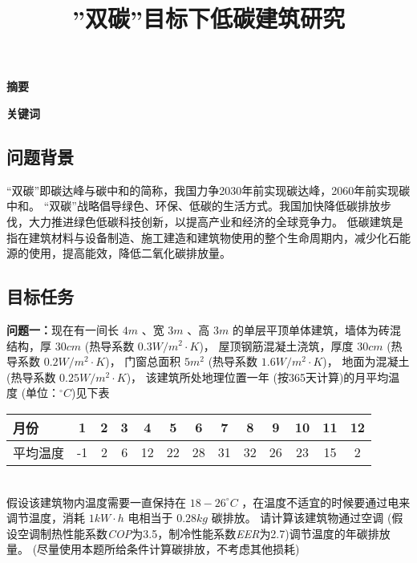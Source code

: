 \documentclass[a4paper, 12pt]{article}
\numberwithin{equation}{section}
\begin{document}
    \title{''双碳''目标下低碳建筑研究}
    \author{}
    \date{}
    \maketitle

    \centerline{\textbf{\LARGE{摘要}}}

    \textbf{\large{关键词}}

    {}
        \subsection{问题背景}
        “双碳”即碳达峰与碳中和的简称，我国力争2030年前实现碳达峰，2060年前实现碳中和。
        “双碳”战略倡导绿色、环保、低碳的生活方式。我国加快降低碳排放步伐，大力推进绿色低碳科技创新，以提高产业和经济的全球竞争力。
        低碳建筑是指在建筑材料与设备制造、施工建造和建筑物使用的整个生命周期内，减少化石能源的使用，提高能效，降低二氧化碳排放量。

        \subsection{目标任务}
            \textbf{问题一：}现在有一间长 $ 4 m $ 、宽 $ 3 m $ 、高 $ 3 m $ 的单层平顶单体建筑，墙体为砖混结构，厚 $ 30 cm $ (热导系数 $ 0.3 W / m^{2} \cdot K $)，
            屋顶钢筋混凝土浇筑，厚度 $ 30 cm $ (热导系数 $ 0.2 W / m^{2} \cdot K $)，
            门窗总面积 $ 5 m^{2} $ (热导系数 $ 1.6 W / m^{2} \cdot K $)，
            地面为混凝土 (热导系数 $ 0.25 W / m^{2} \cdot K $)，
            该建筑所处地理位置一年 (按365天计算)的月平均温度 (单位：$ ^{\circ} C $)见下表 \\
            \begin{table}
                \centering
                \begin{tabular}{|l|c|c|c|c|c|c|c|c|c|c|c|c|}
                    \hline
                    月份 & 1 & 2 & 3 & 4 & 5 & 6 & 7 & 8 & 9 & 10 & 11 & 12 \\
                    \hline
                    平均温度 & -1 & 2 & 6 & 12 & 22 & 28 & 31 & 32 & 26 & 23 & 15 & 2\\
                    \hline
                \end{tabular}
            \end{table}
            \\ 假设该建筑物内温度需要一直保持在 $ 18 - 26 ^{\circ}C $ ，在温度不适宜的时候要通过电来调节温度，消耗 $ 1 kW \cdot h $ 电相当于 $ 0.28kg $ 碳排放。
            请计算该建筑物通过空调 (假设空调制热性能系数\textit{COP}为3.5，制冷性能系数\textit{EER}为2.7)调节温度的年碳排放量。
            (尽量使用本题所给条件计算碳排放，不考虑其他损耗)
\end{document}
